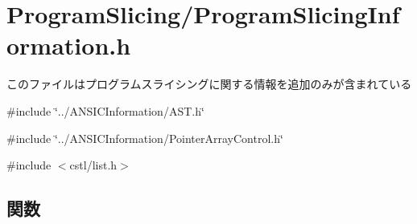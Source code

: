 \section{ProgramSlicing/ProgramSlicingInformation.h}
\label{ProgramSlicingInformation_8h}


このファイルはプログラムスライシングに関する情報を追加のみが含まれている  


{\ttfamily \#include \char`\"{}../ANSICInformation/AST.h\char`\"{}}\par
{\ttfamily \#include \char`\"{}../ANSICInformation/PointerArrayControl.h\char`\"{}}\par
{\ttfamily \#include $<$cstl/list.h$>$}\par
\subsection*{関数}
